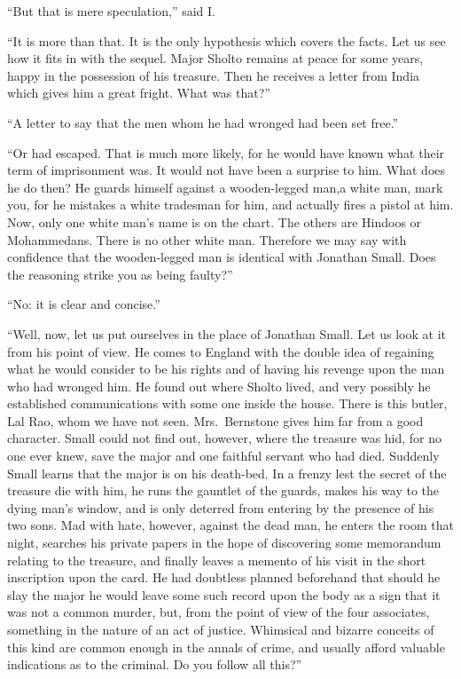 \documentclass[12pt,english,oneside]{book}
\begin{document}
{}``But that is mere speculation,'' said I.

{}``It is more than that. It is the only hypothesis which covers
the facts. Let us see how it fits in with the sequel. Major Sholto
remains at peace for some years, happy in the possession of his treasure.
Then he receives a letter from India which gives him a great fright.
What was that?''

{}``A letter to say that the men whom he had wronged had been set
free.''

{}``Or had escaped. That is much more likely, for he would have known
what their term of imprisonment was. It would not have been a surprise
to him. What does he do then? He guards himself against a wooden-legged
man,\mdsh{---}a white man, mark you, for he mistakes a white tradesman
for him, and actually fires a pistol at him. Now, only one white man's
name is on the chart. The others are Hindoos or Mohammedans. There
is no other white man. Therefore we may say with confidence that the
wooden-legged man is identical with Jonathan Small. Does the reasoning
strike you as being faulty?''

{}``No: it is clear and concise.''

{}``Well, now, let us put ourselves in the place of Jonathan Small.
Let us look at it from his point of view. He comes to England with
the double idea of regaining what he would consider to be his rights
and of having his revenge upon the man who had wronged him. He found
out where Sholto lived, and very possibly he established communications
with some one inside the house. There is this butler, Lal Rao, whom
we have not seen. Mrs.\ Bernstone gives him far from a good character.
Small could not find out, however, where the treasure was hid, for
no one ever knew, save the major and one faithful servant who had
died. Suddenly Small learns that the major is on his death-bed. In
a frenzy lest the secret of the treasure die with him, he runs the
gauntlet of the guards, makes his way to the dying man's window, and
is only deterred from entering by the presence of his two sons. Mad
with hate, however, against the dead man, he enters the room that
night, searches his private papers in the hope of discovering some
memorandum relating to the treasure, and finally leaves a memento
of his visit in the short inscription upon the card. He had doubtless
planned beforehand that should he slay the major he would leave some
such record upon the body as a sign that it was not a common murder,
but, from the point of view of the four associates, something in the
nature of an act of justice. Whimsical and bizarre conceits of this
kind are common enough in the annals of crime, and usually afford
valuable indications as to the criminal. Do you follow all this?''
\end{document}
